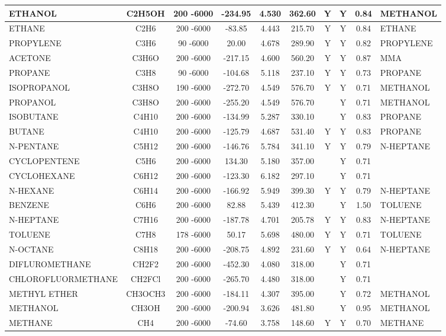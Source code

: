 \begin{longtable}{@{\extracolsep{\fill}}|l|c|c|c|c|c|c|c|c|l|}
	ETHANOL&C2H5OH&200 -6000& -234.95& 4.530&   362.60&Y&Y& 0.84&METHANOL\\ \hline
	ETHANE&C2H6&200 -6000&  -83.85& 4.443&   215.70&Y&Y& 0.84&ETHANE\\ \hline
	PROPYLENE&C3H6&90 -6000&   20.00& 4.678&   289.90&Y&Y& 0.82&PROPYLENE\\ \hline
	ACETONE&C3H6O&200 -6000& -217.15& 4.600&   560.20&Y&Y& 0.87&MMA\\ \hline
	PROPANE&C3H8&90 -6000& -104.68& 5.118&   237.10&Y&Y& 0.73&PROPANE\\ \hline
	ISOPROPANOL&C3H8O&190 -6000& -272.70& 4.549&   576.70&Y&Y& 0.71&METHANOL\\ \hline
	PROPANOL&C3H8O&200 -6000& -255.20& 4.549&   576.70& &Y& 0.71&METHANOL\\ \hline
	ISOBUTANE&C4H10&200 -6000& -134.99& 5.287&   330.10& &Y& 0.83&PROPANE\\ \hline
	BUTANE&C4H10&200 -6000& -125.79& 4.687&   531.40&Y&Y& 0.83&PROPANE\\ \hline
	N-PENTANE&C5H12&200 -6000& -146.76& 5.784&   341.10&Y&Y& 0.79&N-HEPTANE\\ \hline
	CYCLOPENTENE&C5H6&200 -6000&  134.30& 5.180&   357.00& &Y& 0.71&\\ \hline
	CYCLOHEXANE&C6H12&200 -6000& -123.30& 6.182&   297.10& &Y& 0.71&\\ \hline
	N-HEXANE&C6H14&200 -6000& -166.92& 5.949&   399.30&Y&Y& 0.79&N-HEPTANE\\ \hline
	BENZENE&C6H6&200 -6000&   82.88& 5.439&   412.30& &Y& 1.50&TOLUENE\\ \hline
	N-HEPTANE&C7H16&200 -6000& -187.78& 4.701&   205.78&Y&Y& 0.83&N-HEPTANE\\ \hline
	TOLUENE&C7H8&178 -6000&   50.17& 5.698&   480.00&Y&Y& 0.71&TOLUENE\\ \hline
	N-OCTANE&C8H18&200 -6000& -208.75& 4.892&   231.60&Y&Y& 0.64&N-HEPTANE\\ \hline
	DIFLUROMETHANE&CH2F2&200 -6000& -452.30& 4.080&   318.00& &Y& 0.71&\\ \hline
	CHLOROFLUORMETHANE&CH2FCl&200 -6000& -265.70& 4.480&   318.00& &Y& 0.71&\\ \hline
	METHYL ETHER&CH3OCH3&200 -6000& -184.11& 4.307&   395.00& &Y& 0.72&METHANOL\\ \hline
	METHANOL&CH3OH&200 -6000& -200.94& 3.626&   481.80& &Y& 0.95&METHANOL\\ \hline
	METHANE&CH4&200 -6000&  -74.60& 3.758&   148.60&Y&Y& 0.70&METHANE\\ \hline

\end{longtable}
